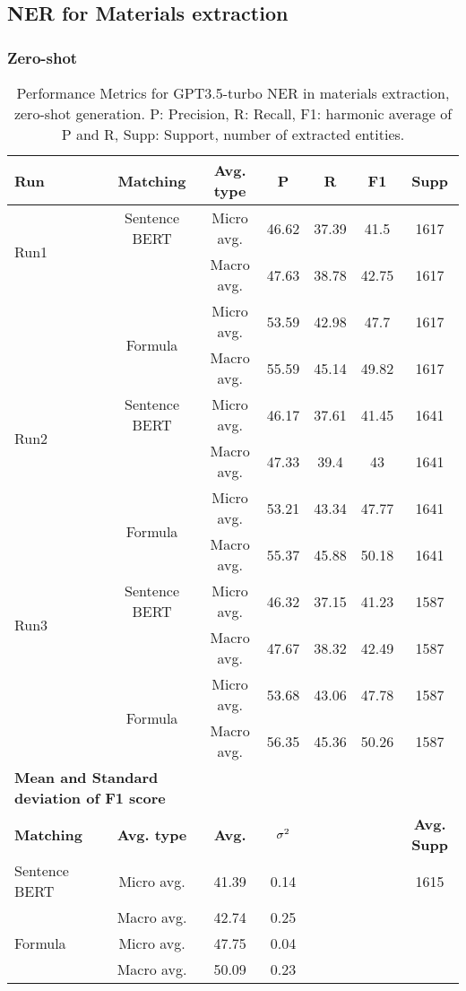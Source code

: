 \clearpage

\subsection{NER for Materials extraction}

\subsubsection{Zero-shot}

\begin{table}[htbp]
\small
  \centering
  \caption{Performance Metrics for GPT3.5-turbo NER in materials extraction, zero-shot generation. P: Precision, R: Recall, F1: harmonic average of P and R, Supp: Support, number of extracted entities.}
  \begin{tabular}{lcccccc}
    \toprule
    \textbf{Run} & \textbf{Matching} & \textbf{Avg. type} & \textbf{P} & \textbf{R} & \textbf{F1} & \textbf{Supp} \\
    \midrule
    \multirow{2}{*}{Run1} & Sentence BERT & Micro avg. & 46.62 & 37.39 & 41.5 & 1617 \\
    & & Macro avg. & 47.63 & 38.78 & 42.75 & 1617 \\
    \cmidrule{2-7}
    & \multirow{2}{*}{Formula} & Micro avg. & 53.59 & 42.98 & 47.7 & 1617 \\
    & & Macro avg. & 55.59 & 45.14 & 49.82 & 1617 \\
    \midrule
    \multirow{2}{*}{Run2} & Sentence BERT & Micro avg. & 46.17 & 37.61 & 41.45 & 1641 \\
    & & Macro avg. & 47.33 & 39.4 & 43 & 1641 \\
    \cmidrule{2-7}
    & \multirow{2}{*}{Formula} & Micro avg. & 53.21 & 43.34 & 47.77 & 1641 \\
    & & Macro avg. & 55.37 & 45.88 & 50.18 & 1641 \\
    \midrule
    \multirow{2}{*}{Run3} & Sentence BERT & Micro avg. & 46.32 & 37.15 & 41.23 & 1587 \\
    & & Macro avg. & 47.67 & 38.32 & 42.49 & 1587 \\
    \cmidrule{2-7}
    & \multirow{2}{*}{Formula} & Micro avg. & 53.68 & 43.06 & 47.78 & 1587 \\
    & & Macro avg. & 56.35 & 45.36 & 50.26 & 1587 \\
    \midrule
    \multicolumn{2}{l}{\textbf{Mean and Standard deviation of F1 score}} & & & & & \\
    \midrule
    \textbf{Matching} & \textbf{Avg. type} & \textbf{Avg.} & $\sigma\textsuperscript{2}$ & & & \textbf{Avg. Supp}\\
    Sentence BERT & Micro avg. & 41.39 & 0.14 & & & 1615 \\
    & Macro avg. & 42.74 & 0.25 & & & \\
    Formula & Micro avg. & 47.75 & 0.04 & & & \\
    & Macro avg. & 50.09 & 0.23 & & & \\
    \bottomrule
  \end{tabular}
\end{table}



